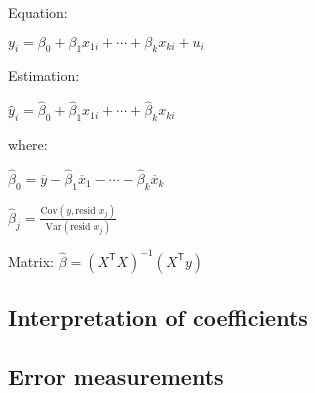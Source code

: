 \documentclass[10pt, a4paper, landscape]{extarticle}
\newcommand{\Var}{\mathrm{Var}}
\newcommand{\Cov}{\mathrm{Cov}}
\newcommand{\tr}{\mathsf{T}}
\begin{document}
\begin{multicols}{3}
\begin{multicols}{2}
\columnbreak

Equation:

\begin{center}
	$y_i = \beta_0 + \beta_1 x_{1i} + \cdots + \beta_k x_{ki} + u_i$
\end{center}

Estimation:

\begin{center}
	$\hat{y}_i = \hat{\beta}_0 + \hat{\beta}_1 x_{1i} + \cdots + \hat{\beta}_k x_{ki}$
\end{center}

where:

\begin{center}
	$\hat{\beta}_0 = \overline{y} - \hat{\beta}_1 \overline{x}_1 - \cdots - \hat{\beta}_k \overline{x}_k$
	
	$\hat{\beta}_j = \frac{\Cov(y, \text{resid } x_j)}{\Var(\text{resid } x_j)}$
\end{center}

Matrix: $\hat{\beta} = (X^\tr X)^{-1} (X^\tr y)$

\end{multicols}

\subsection*{Interpretation of coefficients}

\begin{center}
\end{center}

\subsection*{Error measurements}


\end{multicols}
\end{document}
